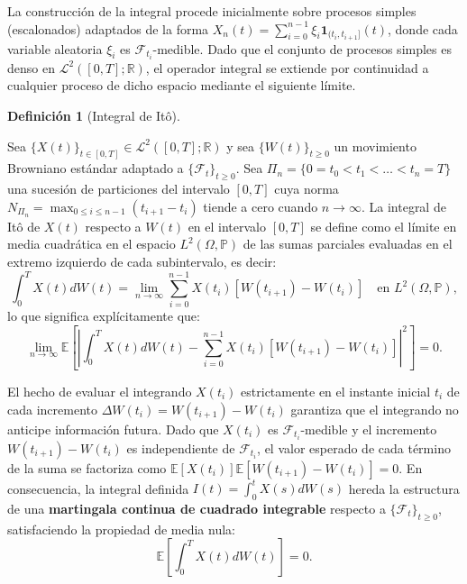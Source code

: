 \documentclass[
  spanish,
  us-letterpaper,
]{scrreprt}
\numberwithin{equation}{section}
\theoremstyle{plain}
\theoremstyle{plain}
\theoremstyle{definition}
\newtheorem{definition}{Definición}[chapter]
\theoremstyle{plain}
\theoremstyle{remark}
\begin{document}
La construcción de la integral procede inicialmente sobre procesos
simples (escalonados) adaptados de la forma
\(\displaystyle X_n(t) = \sum_{i=0}^{n-1} \xi_i \mathbf{1}_{(t_i, t_{i+1}]}(t)\),
donde cada variable aleatoria \(\xi_i\) es
\(\mathcal{F}_{t_i}\)-medible. Dado que el conjunto de procesos simples
es denso en \(\mathcal{L}^2([0, T]; \mathbb{R})\), el operador integral
se extiende por continuidad a cualquier proceso de dicho espacio
mediante el siguiente límite.

\begin{definition}[Integral de
Itô]\protect\hypertarget{def-integral-ito}{}\label{def-integral-ito}

Sea \(\{X(t)\}_{t \in [0, T]} \in \mathcal{L}^2([0, T]; \mathbb{R})\) y
sea \(\{W(t)\}_{t \ge 0}\) un movimiento Browniano estándar adaptado a
\(\{\mathcal{F}_t\}_{t \ge 0}\). Sea
\(\Pi_n = \{0 = t_0 < t_1 < \dots < t_n = T\}\) una sucesión de
particiones del intervalo \([0, T]\) cuya norma
\(\displaystyle N_{\Pi_n} = \max_{0 \le i \le n-1} (t_{i+1} - t_i)\)
tiende a cero cuando \(n \to \infty\). La integral de Itô de \(X(t)\)
respecto a \(W(t)\) en el intervalo \([0, T]\) se define como el límite
en media cuadrática en el espacio \(L^2(\Omega, \mathbb{P})\) de las
sumas parciales evaluadas en el extremo izquierdo de cada subintervalo,
es decir: \[
\int_0^T X(t) dW(t) = \lim_{n \to \infty} \sum_{i=0}^{n-1} X(t_i) \left[ W(t_{i+1}) - W(t_i) \right] \quad \text{en } L^2(\Omega, \mathbb{P}),
\] lo que significa explícitamente que: \[
\lim_{n \to \infty} \mathbb{E}\left[ \left\vert \int_0^T X(t) dW(t) - \sum_{i=0}^{n-1} X(t_i) \left[ W(t_{i+1}) - W(t_i) \right] \right\vert^2 \right] = 0.
\]

\end{definition}

El hecho de evaluar el integrando \(X(t_i)\) estrictamente en el
instante inicial \(t_i\) de cada incremento
\(\Delta W(t_i) = W(t_{i+1}) - W(t_i)\) garantiza que el integrando no
anticipe información futura. Dado que \(X(t_i)\) es
\(\mathcal{F}_{t_i}\)-medible y el incremento \(W(t_{i+1}) - W(t_i)\) es
independiente de \(\mathcal{F}_{t_i}\), el valor esperado de cada
término de la suma se factoriza como
\(\mathbb{E}[X(t_i)]\mathbb{E}[W(t_{i+1}) - W(t_i)] = 0\). En
consecuencia, la integral definida
\(I(t) = \displaystyle \int_0^t X(s) dW(s)\) hereda la estructura de una
\textbf{martingala continua de cuadrado integrable} respecto a
\(\{\mathcal{F}_t\}_{t \ge 0}\), satisfaciendo la propiedad de media
nula: \[
\mathbb{E}\left[ \int_0^T X(t) dW(t) \right] = 0.
\]
\end{document}
